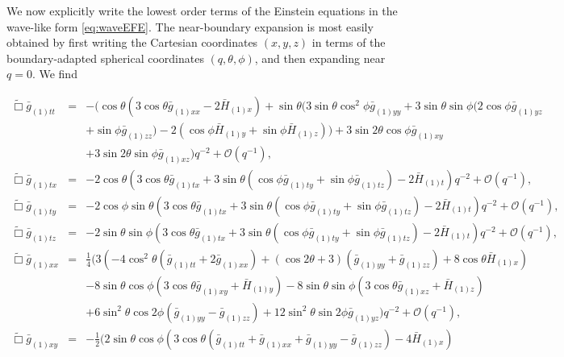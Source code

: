 \documentclass[aps,letterpaper,twocolumn,nofootinbib]{revtex4}
\numberwithin{equation}{section}
\begin{document}
We now explicitly write the lowest order terms of the Einstein equations in the wave-like form \eqref{eq:waveEFE}.
The near-boundary expansion is most easily obtained by first writing the Cartesian coordinates $(x,y,z)$ in terms of the boundary-adapted spherical coordinates $(q,\theta,\phi)$, and then expanding near $q=0$. We find
\vspace{16\baselineskip}
\begin{widetext}
\begin{eqnarray}\label{eqn:efett}
\tilde{\Box}\bar{g}_{(1)tt}&=&-(\cos \theta (3 \cos \theta \bar{g}_{(1)xx}-2 \bar{H}_{(1)x})+\sin\theta (3 \sin \theta \cos^2\phi \bar{g}_{(1) yy}+3
  \sin \theta \sin \phi (2 \cos \phi \bar{g}_{(1) yz} \nonumber \\
&&+\sin\phi
  \bar{g}_{(1) zz})-2 (\cos \phi \bar{H}_{(1) y}+\sin\phi
  \bar{H}_{(1) z}))+3 \sin 2 \theta \cos \phi \bar{g}_{(1) xy} \nonumber \\
&&+3
  \sin 2 \theta \sin \phi \bar{g}_{(1) xz})q^{-2} +\mathcal{O}(q^{-1}),\\
%
\label{eqn:efetx}
\tilde{\Box}\bar{g}_{(1)tx}&=&-2 \cos \theta (3 \cos\theta \bar{g}_{(1) tx}+3 \sin \theta
  (\cos \phi \bar{g}_{(1) ty}+\sin \phi \bar{g}_{(1)tz})-2
  \bar{H}_{(1) t})  q^{-2}+\mathcal{O}(q^{-1}),\\
%
\label{eqn:efety}
\tilde{\Box}\bar{g}_{(1)ty}&=&-2 \cos \phi \sin\theta (3 \cos\theta \bar{g}_{(1) tx}+3 \sin \theta
  (\cos \phi \bar{g}_{(1) ty}+\sin \phi \bar{g}_{(1)tz})-2
  \bar{H}_{(1) t})  q^{-2}+\mathcal{O}(q^{-1}),\\
%
\label{eqn:efetz}
\tilde{\Box}\bar{g}_{(1)tz}&=&-2 \sin \theta \sin\phi (3 \cos\theta \bar{g}_{(1) tx}+3 \sin \theta
  (\cos \phi \bar{g}_{(1) ty}+\sin \phi \bar{g}_{(1)tz})-2
  \bar{H}_{(1) t})  q^{-2}+\mathcal{O}(q^{-1}),\\
%
\label{eqn:efexx}
\tilde{\Box}\bar{g}_{(1)xx}&=&\frac{1}{4} (3 (-4 \cos ^2\theta (\bar{g}_{(1) tt}+2 \bar{g}_{(1)
  xx})+(\cos 2 \theta +3) (\bar{g}_{(1) yy}+\bar{g}_{(1)
zz}) +8 \cos \theta \bar{H}_{(1) x})\nonumber \\
&&-8 \sin \theta \cos \phi 
  (3 \cos \theta \bar{g}_{(1)xy}+\bar{H}_{(1) y}) -8 \sin\theta \sin\phi (3 \cos\theta \bar{g}_{(1) xz}+\bar{H}_{(1) z}) \nonumber \\
  &&+6 \sin^2\theta \cos 2 \phi (\bar{g}_{(1)yy}-\bar{g}_{(1)zz})+12
  \sin^2\theta \sin 2 \phi \bar{g}_{(1) yz})  q^{-2} +\mathcal{O}(q^{-1}),\\
%
\label{eqn:efexy}
\tilde{\Box}\bar{g}_{(1)xy}&=&-\frac{1}{2} (2 \sin \theta \cos \phi (3 \cos \theta (\bar{g}_{(1)tt}+\bar{g}_{(1)xx}+\bar{g}_{(1)yy}-\bar{g}_{(1)zz})-4 \bar{H}_{(1) x}) \nonumber \\

\end{eqnarray}
\end{widetext}
\end{document}
